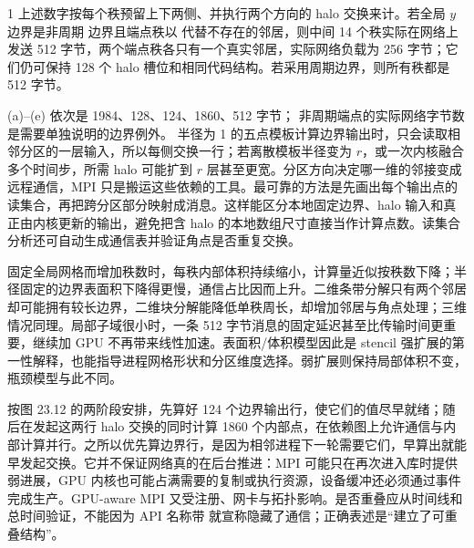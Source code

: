 \begin{solutionexercise}{1}
上述数字按每个秩预留上下两侧、并执行两个方向的 halo 交换来计。若全局 $y$ 边界是非周期
边界且端点秩以  代替不存在的邻居，则中间 14 个秩实际在网络上发送
512 字节，两个端点秩各只有一个真实邻居，实际网络负载为 256 字节；它们仍可保持 128 个
halo 槽位和相同代码结构。若采用周期边界，则所有秩都是 512 字节。

\conclusionheading (a)--(e) 依次是 1984、128、124、1860、512 字节；
非周期端点的实际网络字节数是需要单独说明的边界例外。
\discussionheading
{}
半径为 1 的五点模板计算边界输出时，只会读取相邻分区的一层输入，所以每侧交换一行；若离散模板半径变为 $r$，或一次内核融合多个时间步，所需 halo 可能扩到 $r$ 层甚至更宽。分区方向决定哪一维的邻接变成远程通信，MPI 只是搬运这些依赖的工具。最可靠的方法是先画出每个输出点的读集合，再把跨分区部分映射成消息。这样能区分本地固定边界、halo 输入和真正由内核更新的输出，避免把含 halo 的本地数组尺寸直接当作计算点数。读集合分析还可自动生成通信表并验证角点是否重复交换。

固定全局网格而增加秩数时，每秩内部体积持续缩小，计算量近似按秩数下降；半径固定的边界表面积下降得更慢，通信占比因而上升。二维条带分解只有两个邻居却可能拥有较长边界，二维块分解能降低单秩周长，却增加邻居与角点处理；三维情况同理。局部子域很小时，一条 512 字节消息的固定延迟甚至比传输时间更重要，继续加 GPU 不再带来线性加速。表面积/体积模型因此是 stencil 强扩展的第一性解释，也能指导进程网格形状和分区维度选择。弱扩展则保持局部体积不变，瓶颈模型与此不同。

按图 23.12 的两阶段安排，先算好 124 个边界输出行，使它们的值尽早就绪；随后在发起这两行 halo 交换的同时计算 1860 个内部点，在依赖图上允许通信与内部计算并行。之所以优先算边界行，是因为相邻进程下一轮需要它们，早算出就能早发起交换。它并不保证网络真的在后台推进：MPI 可能只在再次进入库时提供弱进展，GPU 内核也可能占满需要的复制或执行资源，设备缓冲还必须通过事件完成生产。GPU-aware MPI 又受注册、网卡与拓扑影响。是否重叠应从时间线和总时间验证，不能因为 API 名称带  就宣称隐藏了通信；正确表述是“建立了可重叠结构”。


\end{solutionexercise}
